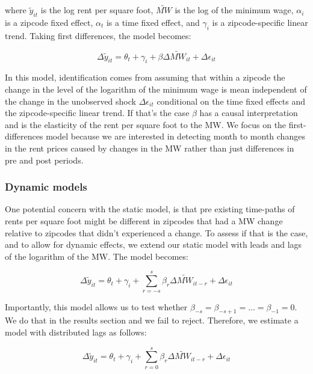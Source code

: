     where $\tilde{y}_{it}$ is the log rent per square foot, $\tilde{MW}$ is the log of the minimum wage, $\alpha_i$ is a zipcode fixed effect, $\alpha_t$ is a time fixed effect, and $\gamma_i$ is a zipcode-specific linear trend. Taking first differences, the model becomes:
    
\begin{equation}\label{eq:diff_main}
        \Delta \tilde{y}_{it} = \theta_t + \gamma_i + \beta \Delta \tilde{MW}_{it}+ \Delta \epsilon_{it}
\end{equation}
    
    In this model, identification comes from assuming that within a zipcode the change in the level of the logarithm of the minimum wage is mean independent of the change in the unobserved shock $\Delta \epsilon_{it}$ conditional on the time fixed effects and the zipcode-specific linear trend. If that's the case $\beta$ has a causal interpretation and is the elasticity of the rent per square foot to the MW. We focus on the first-differences model because we are interested in detecting month to month changes in the rent prices caused by changes in the MW rather than just differences in pre and post periods.
    
\subsubsection{Dynamic models}

One potential concern with the static model, is that pre existing time-paths of rents per square foot might be different in zipcodes that had a MW change relative to zipcodes that didn't experienced a change. To assess if that is the case, and to allow for dynamic effects, we extend our static model with leads and lags of the logarithm of the MW. The model becomes:

\begin{equation}\label{eq:diff_main}
        \Delta \tilde{y}_{it} = \theta_t + \gamma_i + \sum_{r=-s}^{s}\beta_r \Delta \tilde{MW}_{it-r}+ \Delta \epsilon_{it}
\end{equation}

Importantly, this model allows us to test whether $\beta_{-s} = \beta_{-s+1} = ... = \beta_{-1} = 0$. We do that in the results section and we fail to reject. Therefore, we estimate a model with distributed lags as follows:

\begin{equation}\label{eq:diff_main}
        \Delta \tilde{y}_{it} = \theta_t + \gamma_i + \sum_{r=0}^{s}\beta_r \Delta \tilde{MW}_{it-r}+ \Delta \epsilon_{it}
\end{equation}

